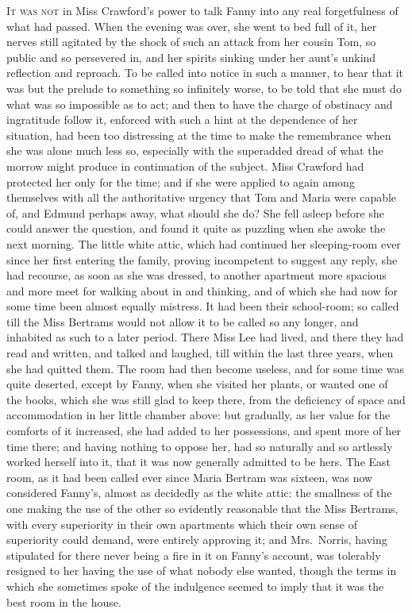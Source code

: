 \documentclass{article}
\newcommand{\gintro}[1]{\textcolor{gcolor}{\textsc{#1}}}
\begin{document}
\gintro{It was not} in Miss Crawford's power to talk Fanny into any
real forgetfulness of what had passed.  When the evening
was over, she went to bed full of it, her nerves still
agitated by the shock of such an attack from her cousin Tom,
so public and so persevered in, and her spirits sinking
under her aunt's unkind reflection and reproach.
To be called into notice in such a manner, to hear that it
was but the prelude to something so infinitely worse,
to be told that she must do what was so impossible as to act;
and then to have the charge of obstinacy and ingratitude
follow it, enforced with such a hint at the dependence
of her situation, had been too distressing at the time
to make the remembrance when she was alone much less so,
especially with the superadded dread of what the
morrow might produce in continuation of the subject.
Miss Crawford had protected her only for the time;
and if she were applied to again among themselves with all
the authoritative urgency that Tom and Maria were capable of,
and Edmund perhaps away, what should she do?  She fell
asleep before she could answer the question, and found
it quite as puzzling when she awoke the next morning.
The little white attic, which had continued her sleeping-room
ever since her first entering the family, proving incompetent
to suggest any reply, she had recourse, as soon as she
was dressed, to another apartment more spacious and more
meet for walking about in and thinking, and of which she
had now for some time been almost equally mistress.
It had been their school-room; so called till the Miss
Bertrams would not allow it to be called so any longer,
and inhabited as such to a later period.  There Miss
Lee had lived, and there they had read and written,
and talked and laughed, till within the last three years,
when she had quitted them.  The room had then become useless,
and for some time was quite deserted, except by Fanny,
when she visited her plants, or wanted one of the books,
which she was still glad to keep there, from the deficiency
of space and accommodation in her little chamber above:
but gradually, as her value for the comforts of it increased,
she had added to her possessions, and spent more of her
time there; and having nothing to oppose her, had so
naturally and so artlessly worked herself into it, that it
was now generally admitted to be hers.  The East room,
as it had been called ever since Maria Bertram was sixteen,
was now considered Fanny's, almost as decidedly as the
white attic:  the smallness of the one making the use of
the other so evidently reasonable that the Miss Bertrams,
with every superiority in their own apartments which their
own sense of superiority could demand, were entirely
approving it; and Mrs.\ Norris, having stipulated for there
never being a fire in it on Fanny's account, was tolerably
resigned to her having the use of what nobody else wanted,
though the terms in which she sometimes spoke of the
indulgence seemed to imply that it was the best room in
the house.
\end{document}
